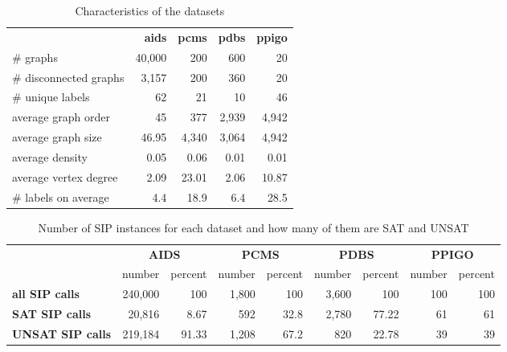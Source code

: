 \documentclass{l4proj}
\begin{document}
\begin{table}
\centering
        \renewcommand{\arraystretch}{1.4}%
        \begin{tabular}{l|r|r|r|r|}
\cline{2-5}
& \textbf{aids} & \textbf{pcms} & \textbf{pdbs} & \textbf{ppigo} \\
\cline{1-5}
\multicolumn{1}{|l|}{\# graphs}  & 40,000 & 200	& 600   & 20 \\
\hline
\multicolumn{1}{|l|}{\# disconnected graphs} & 3,157 & 200 & 360 & 20 \\
\hline
\multicolumn{1}{|l|}{\# unique labels} & 62 & 21 & 10 & 46 \\
\hline
\multicolumn{1}{|l|}{average graph order} & 45 & 377 & 2,939 & 4,942 \\
\hline
\multicolumn{1}{|l|}{average graph size} & 46.95 & 4,340 & 3,064 & 4,942 \\
\hline
\multicolumn{1}{|l|}{average density} & 0.05 & 0.06 & 0.01 & 0.01 \\
\hline
\multicolumn{1}{|l|}{average vertex degree} & 2.09 & 23.01 & 2.06 & 10.87 \\
\hline
\multicolumn{1}{|l|}{\# labels on average} & 4.4 & 18.9 & 6.4 & 28.5 \\
\hline
\end{tabular}
\caption{Characteristics of the datasets}
\label{table:datasets}
\end{table}

\begin{table}
\centering
        \renewcommand{\arraystretch}{1.5}%
        \begin{tabular}{l|r|r|r|r|r|r|r|r|}
            \cline{2-9}
            &
             \multicolumn{2}{c}{\textbf{AIDS}} & 
             \multicolumn{2}{|c}{\textbf{PCMS}} & 
             \multicolumn{2}{|c|}{\textbf{PDBS}} & 
             \multicolumn{2}{c|}{\textbf{PPIGO}} \\
            \cline{2-9}
              & number  & percent & number & percent & number & percent & number & percent \\
              \hline
            \multicolumn{1}{|l|}{\textbf{all SIP calls}}  &240,000   &100 &1,800 &100 &3,600 &100 &100 &100 \\
            \multicolumn{1}{|l|}{\textbf{SAT SIP calls}}  &20,816 &8.67 &592 &32.8 &2,780 &77.22 &61 &61 \\
            \multicolumn{1}{|l|}{\textbf{UNSAT SIP calls}} &219,184 &91.33 &1,208 &67.2 &820 &22.78 &39 &39 \\
            \hline
        \end{tabular}
        \caption{Number of SIP instances for each dataset and how many of them are SAT and UNSAT}
        \label{table:dataSAT}
    \end{table}
\end{document}
